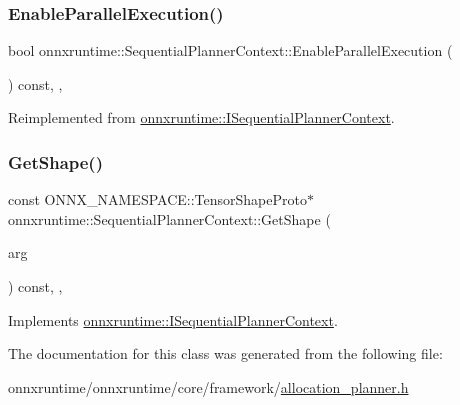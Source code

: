 \subsubsection{\texorpdfstring{Enable\+Parallel\+Execution()}{EnableParallelExecution()}}
{\footnotesize\ttfamily bool onnxruntime\+::\+Sequential\+Planner\+Context\+::\+Enable\+Parallel\+Execution (\begin{DoxyParamCaption}{ }\end{DoxyParamCaption}) const\hspace{0.3cm}{\ttfamily [inline]}, {\ttfamily [override]}, {\ttfamily [virtual]}}



Reimplemented from \mbox{\hyperlink{classonnxruntime_1_1ISequentialPlannerContext_af3f57802287c32c4a0d9b7dd4da88c4a}{onnxruntime\+::\+I\+Sequential\+Planner\+Context}}.

\mbox{\label{classonnxruntime_1_1SequentialPlannerContext_a95afd749e2d38675bab0a41b503d575d}} 
\subsubsection{\texorpdfstring{Get\+Shape()}{GetShape()}}
{\footnotesize\ttfamily const O\+N\+N\+X\+\_\+\+N\+A\+M\+E\+S\+P\+A\+C\+E\+::\+Tensor\+Shape\+Proto$\ast$ onnxruntime\+::\+Sequential\+Planner\+Context\+::\+Get\+Shape (\begin{DoxyParamCaption}\item[{const \mbox{\hyperlink{classonnxruntime_1_1NodeArg}{onnxruntime\+::\+Node\+Arg}} \&}]{arg }\end{DoxyParamCaption}) const\hspace{0.3cm}{\ttfamily [inline]}, {\ttfamily [override]}, {\ttfamily [virtual]}}



Implements \mbox{\hyperlink{classonnxruntime_1_1ISequentialPlannerContext_a7665a01ff1cf7e45b2b84ef9ab2ae741}{onnxruntime\+::\+I\+Sequential\+Planner\+Context}}.



The documentation for this class was generated from the following file\+:\begin{DoxyCompactItemize}
\item 
onnxruntime/onnxruntime/core/framework/\mbox{\hyperlink{allocation__planner_8h}{allocation\+\_\+planner.\+h}}\end{DoxyCompactItemize}
